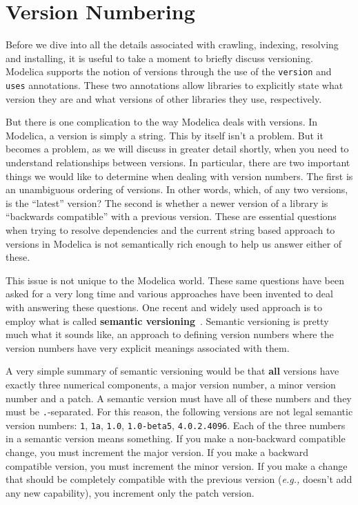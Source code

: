 \documentclass[11pt,a4paper,twocolumn]{article}
\newcommand{\code}[1]{\texttt{#1}} %
\begin{document}
\section{Version Numbering}
\label{sec:numbers}

Before we dive into all the details associated with crawling,
indexing, resolving and installing, it is useful to take a moment to
briefly discuss versioning.  Modelica supports the notion of versions
through the use of the \texttt{version} and \texttt{uses} annotations.  These two
annotations allow libraries to explicitly state what version they are
and what versions of other libraries they use, respectively.

But there is one complication to the way Modelica deals with versions.
In Modelica, a version is simply a string.  This by itself isn't a
problem.  But it becomes a problem, as we will discuss in greater
detail shortly, when you need to understand relationships between
versions.  In particular, there are two important things we would like
to determine when dealing with version numbers.  The first is an
unambiguous ordering of versions.  In other words, which, of any two
versions, is the ``latest'' version?  The second is whether a newer
version of a library is ``backwards compatible'' with a previous
version.  These are essential questions when trying to resolve
dependencies and the current string based approach to versions in
Modelica is not semantically rich enough to help us answer either of
these.

This issue is not unique to the Modelica world.  These same questions
have been asked for a very long time and various approaches have been
invented to deal with answering these questions.  One recent and
widely used approach is to employ what is called \textbf{semantic
  versioning}~\parencite{semver}.  Semantic versioning is pretty much what
it sounds like, an approach to defining version numbers where the
version numbers have very explicit meanings associated with them.

A very simple summary of semantic versioning would be that
\textbf{all} versions have exactly three numerical components, a major
version number, a minor version number and a patch.  A semantic
version must have all of these numbers and they must be
\texttt{.}-separated.  For this reason, the following versions are not
legal semantic version numbers: \code{1}, \code{1a}, \code{1.0},
\code{1.0-beta5}, \code{4.0.2.4096}.  Each of the three numbers in a
semantic version means something.  If you make a non-backward
compatible change, you must increment the major version.  If you make
a backward compatible version, you must increment the minor version.
If you make a change that should be completely compatible with the
previous version (\emph{e.g.,} doesn't add any new capability), you
increment only the patch version.
\end{document}

